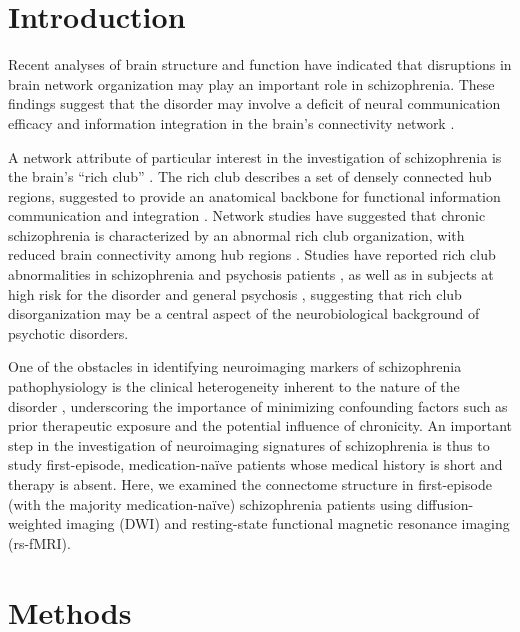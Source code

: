 \begin{refsection}
\section*{Introduction}
Recent analyses of brain structure \citep{Brugger2017HeterogeneityAH,Dietsche2017StructuralBC} and function \citep{Dong2018DysfunctionOL} have indicated that disruptions in brain network organization may play an important role in schizophrenia. These findings suggest that the disorder may involve a deficit of neural communication efficacy and information integration in the brain’s connectivity network \citep{vanDenHeuvel2010AberrantFA}.

A network attribute of particular interest in the investigation of schizophrenia is the brain’s “rich club” \citep{vanDenHeuvel2011RichclubOO}.  The rich club describes a set of densely connected hub regions, suggested to provide an anatomical backbone for functional information communication and integration \citep{Abraham2017DerivingRB,vanDenHeuvel2012HighcostHB}. Network studies have suggested that chronic schizophrenia is characterized by an abnormal rich club organization, with reduced brain connectivity among hub regions \citep{vanDenHeuvel2013AbnormalRC}. Studies have reported rich club abnormalities in schizophrenia and psychosis patients \citep{Yeo2016GraphMO,Klauser2017WhiteMD,Crossley2017ConnectomicCO}, as well as in subjects at high risk for the disorder \citep{Collin2014ImpairedRC} and general psychosis \citep{Schmidt2017StructuralND}, suggesting that rich club disorganization may be a central aspect of the neurobiological background of psychotic disorders.

One of the obstacles in identifying neuroimaging markers of schizophrenia pathophysiology is the clinical heterogeneity inherent to the nature of the disorder \citep{Millan2016AlteringTC}, underscoring the importance of minimizing confounding factors such as prior therapeutic exposure and the potential influence of chronicity. An important step in the investigation of neuroimaging signatures of schizophrenia is thus to study first-episode, medication-na\"{i}ve patients whose medical history is short and therapy is absent. Here, we examined the connectome structure in first-episode (with the majority medication-na\"{i}ve) schizophrenia patients using diffusion-weighted imaging (DWI) and resting-state functional magnetic resonance imaging (rs-fMRI).

\section*{Methods}

\end{refsection}
